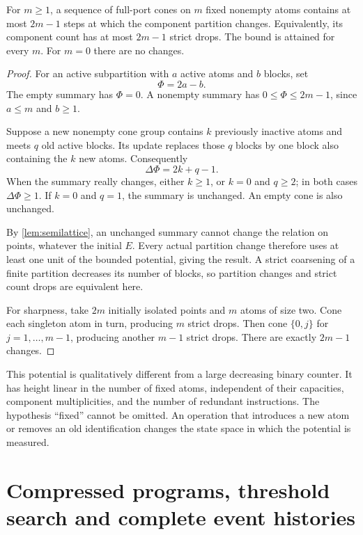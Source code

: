 \begin{theorem}
\label{thm:height}
For $m\ge1$, a sequence of full-port cones on $m$ fixed nonempty atoms
contains at most $2m-1$ steps at which the component partition changes.
Equivalently, its component count has at most $2m-1$ strict drops.
The bound is attained for every $m$. For $m=0$ there are no changes.
\end{theorem}

\begin{proof}
For an active subpartition with $a$ active atoms and $b$ blocks, set
\[
 \Phi=2a-b.
\]
The empty summary has $\Phi=0$. A nonempty summary has
$0\le\Phi\le2m-1$, since $a\le m$ and $b\ge1$.

Suppose a new nonempty cone group contains $k$ previously inactive atoms
and meets $q$ old active blocks. Its update replaces those $q$ blocks by
one block also containing the $k$ new atoms. Consequently
\[
 \Delta\Phi=2k+q-1.
\]
When the summary really changes, either $k\ge1$, or $k=0$ and $q\ge2$;
in both cases $\Delta\Phi\ge1$. If $k=0$ and $q=1$, the summary is
unchanged. An empty cone is also unchanged.

By \cref{lem:semilattice}, an unchanged summary cannot change the relation
on points, whatever the initial $E$. Every actual partition change therefore
uses at least one unit of the bounded potential, giving the result.
A strict coarsening of a finite partition decreases its number of blocks,
so partition changes and strict count drops are equivalent here.

For sharpness, take $2m$ initially isolated points and $m$ atoms of size two.
Cone each singleton atom in turn, producing $m$ strict drops. Then cone
$\{0,j\}$ for $j=1,\ldots,m-1$, producing another $m-1$ strict drops.
There are exactly $2m-1$ changes.
\end{proof}

This potential is qualitatively different from a large decreasing binary
counter. It has height linear in the number of fixed atoms, independent of
their capacities, component multiplicities, and the number of redundant
instructions. The hypothesis ``fixed'' cannot be omitted. An operation that
introduces a new atom or removes an old identification changes the state
space in which the potential is measured.

\section{Compressed programs, threshold search and complete event histories}
\label{sec:programs}

